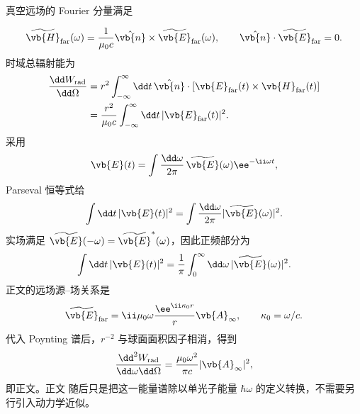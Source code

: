 \begin{derivation}[远场振幅与辐射能谱]
真空远场的 Fourier 分量满足

\begin{equation*}
 \widetilde{\vb{H}}_{\rm far}(\omega)
 =\frac1{\mu_0c}\hat{\vb{n}}\times
 \widetilde{\vb{E}}_{\rm far}(\omega),
 \qquad
 \hat{\vb{n}}\cdot\widetilde{\vb{E}}_{\rm far}=0.
\end{equation*}
时域总辐射能为
\begin{align*}
 \frac{\dd W_{\rm rad}}{\dd\Omega}
 &=r^2\int_{-\infty}^{\infty}\dd t\,
 \hat{\vb{n}}\cdot
 [\vb{E}_{\rm far}(t)\times\vb{H}_{\rm far}(t)]\\
 &=\frac{r^2}{\mu_0c}
 \int_{-\infty}^{\infty}\dd t\,|\vb{E}_{\rm far}(t)|^2.
\end{align*}
采用
\begin{equation*}
 \vb{E}(t)=\int\frac{\dd\omega}{2\pi}\,
 \widetilde{\vb{E}}(\omega)\ee^{-\ii\omega t},
\end{equation*}
Parseval 恒等式给
\begin{equation*}
 \int\dd t\,|\vb{E}(t)|^2
 =\int\frac{\dd\omega}{2\pi}|\widetilde{\vb{E}}(\omega)|^2.
\end{equation*}
实场满足 $\widetilde{\vb{E}}(-\omega)=\widetilde{\vb{E}}^{*}(\omega)$，因此正频部分为
\begin{equation*}
 \int\dd t\,|\vb{E}(t)|^2
 =\frac1\pi\int_0^\infty\dd\omega\,
 |\widetilde{\vb{E}}(\omega)|^2.
\end{equation*}
正文的远场源--场关系是
\begin{equation*}
 \widetilde{\vb{E}}_{\rm far}
 =\ii\mu_0\omega\frac{\ee^{\ii\kappa_0r}}{r}
 \vb{A}_\infty,
 \qquad \kappa_0=\omega/c.
\end{equation*}
代入 Poynting 谱后，$r^{-2}$ 与球面面积因子相消，得到
\begin{equation*}
 \frac{\dd^2 W_{\rm rad}}{\dd\omega\dd\Omega}
 =\frac{\mu_0\omega^2}{\pi c}|\vb{A}_\infty|^2,
\end{equation*}
即正文。正文 随后只是把这一能量谱除以单光子能量 $\hbar\omega$ 的定义转换，不需要另行引入动力学近似。
\end{derivation}

